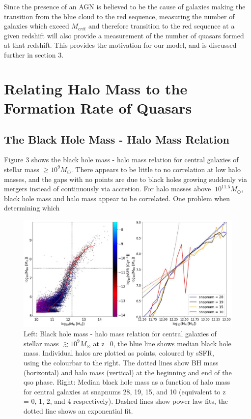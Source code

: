 \documentclass[12pt]{article}%
\begin{document}
\vspace*{1cm}

Since the presence of an AGN is believed to be the cause of galaxies making the transition from the blue cloud to the red sequence, measuring the number of galaxies which exceed $M_{crit}$ and therefore transition to the red sequence at a given redshift will also provide a measurement of the number of quasars formed at that redshift. This provides the motivation for our model, and is discussed further in section 3.

\section{Relating Halo Mass to the Formation Rate of Quasars}
\subsection{The Black Hole Mass - Halo Mass Relation}

Figure 3 shows the black hole mass - halo mass relation for central galaxies of stellar mass $\geq10^9M_\odot$. There appears to be little to no correlation at low halo masses, and the gaps with no points are due to black holes growing suddenly via mergers instead of continuously via accretion. For halo masses above $~10^{11.5}M_\odot$, black hole mass and halo mass appear to be correlated. One problem when determining which

\onecolumngrid


\begin{figure}[H]
\centering
\includegraphics[width=17cm]{Plot_3.jpeg}
\caption{Left: Black hole mass - halo mass relation for central galaxies of stellar mass $\gtrsim10^9M_\odot$ at z=0, the blue line shows median black hole mass. Individual halos are plotted as points, coloured by sSFR, using the colourbar to the right. The dotted lines show BH mass (horizontal) and halo mass (vertical) at the beginning and end of the qso phase. Right: Median black hole mass as a function of halo mass for central galaxies at snapnums 28, 19, 15, and 10 (equivalent to z = 0, 1, 2, and 4 respectively). Dashed lines show power law fits, the dotted line shows an exponential fit.}
\label{fig:3}
\end{figure}
\twocolumngrid
\end{document}
